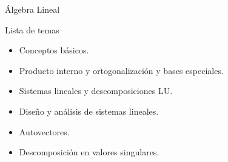\documentclass[10pt, aspectratio=169]{beamer}
\begin{document}
\begin{frame}{\'Algebra Lineal}

{\large\textcolor{RawSienna}{Lista de temas}} 

\vspace{0.3cm}

\begin{itemize}
	\item Conceptos b\'asicos.
	\item Producto interno y ortogonalizaci\'on y bases especiales.
	\item Sistemas lineales y descomposiciones LU.
	\item Dise\~no y an\'alisis de sistemas lineales. 
	\item Autovectores.
	\item Descomposici\'on en valores singulares. 
\end{itemize}

\end{frame}
\end{document}
